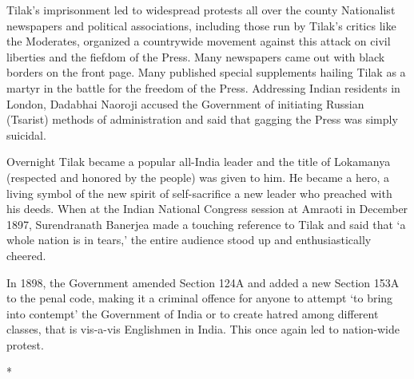 Tilak's imprisonment led to widespread protests all over the county Nationalist newspapers and political associations, including those run by Tilak's critics like the Moderates, organized a countrywide movement against this attack on civil liberties and the fiefdom of the Press. Many newspapers came out with black borders on the front page. Many published special supplements hailing Tilak as a martyr in the battle for the freedom of the Press. Addressing Indian residents in London, Dadabhai Naoroji accused the Government of initiating Russian (Tsarist) methods of administration and said that gagging the Press was simply suicidal.

Overnight Tilak became a popular all-India leader and the title of Lokamanya (respected and honored by the people) was given to him. He became a hero, a living symbol of the new spirit of self-sacrifice a new leader who preached with his deeds. When at the Indian National Congress session at Amraoti in December 1897, Surendranath Banerjea made a touching reference to Tilak and said that `a whole nation is in tears,' the entire audience stood up and enthusiastically cheered.

In 1898, the Government amended Section 124A and added a new Section 153A to the penal code, making it a criminal offence for anyone to attempt `to bring into contempt' the Government of India or to create hatred among different classes, that is vis-a-vis Englishmen in India. This once again led to nation-wide protest.

\begin{center}*\end{center}

